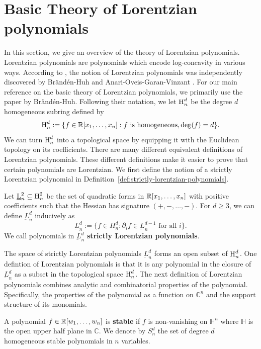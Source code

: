 \documentclass{puthesis-UG}
\begin{document}
\section{Basic Theory of Lorentzian polynomials} \label{sec:lorentzian-polynomials}

In this section, we give an overview of the theory of Lorentzian polynomials. Lorentzian polynomials are polynomials which encode log-concavity in various ways. According to \cite{baker_2022}, the notion of Lorentzian polynomials was independently discovered by Brändén-Huh \cite{lorentzian-polynomials} and Anari-Oveis-Garan-Vinzant \cite{anari2018logconcave}. For our main reference on the basic theory of Lorentzian polynomials, we primarily use the paper \cite{lorentzian-polynomials} by Brändén-Huh. Following their notation, we let $\operatorname{H}_n^d$ be the degree $d$ homogeneous subring defined by 
\[
	\operatorname{H}_n^d := \{f \in \mathbb{R}[x_1, \ldots, x_n] : \text{$f$ is homogeneous,} \deg (f) = d\}.
\] 
We can turn $\operatorname{H}_n^d$ into a topological space by equipping it with the Euclidean topology on its coefficients. There are many different equivalent definitions of Lorentzian polynomials. These different definitions make it easier to prove that certain polynomials are Lorentzian. We first define the notion of a strictly Lorentzian polynomial in Definition~\ref{def:strictly-lorentzian-polynomials}. 

\begin{defn} \label{def:strictly-lorentzian-polynomials}
	Let $\underbar{L}_n^2 \subseteq \operatorname{H}_n^2$ be the set of quadratic forms in $\mathbb{R}[x_1, \ldots, x_n]$ with positive coefficients such that the Hessian has signature $(+, -, \ldots, -)$. For $d \geq 3$, we can define $\underbar{L}_n^d$ inducively as
	\[
		\underbar{L}_n^d := \{f \in H_n^d : \partial_i f \in \underbar{L}_n^{d-1} \text{ for all $i$}\}.
	\] 
	We call polynomials in $\underbar{L}_n^d$ \textbf{strictly Lorentzian polynomials}. 
\end{defn}

The space of strictly Lorentzian polynomials $\underbar{L}_n^d$ forms an open subset of $\operatorname{H}_n^d$. One defintion of Lorentzian polynomials is that it is any polynomial in the closure of $\underbar{L}_n^d$ as a subset in the topological space $\operatorname{H}_n^d$. The next definition of Lorentzian polynomials combines analytic and combinatorial properties of the polynomial. Specifically, the properties of the polynomial as a function on $\mathbb{C}^n$ and the support structure of its monomials. 

\begin{defn} \label{def:stable-polynomial}
	A polynomial $f \in \mathbb{R}[w_1, \ldots, w_n]$ is \textbf{stable} if $f$ is non-vanishing on $\mathbb{H}^n$ where $\mathbb{H}$ is the open upper half plane in $\mathbb{C}$. We denote by $S_n^d$ the set of degree $d$ homogeneous stable polynomials in $n$ variables. 
\end{defn}
\end{document}
